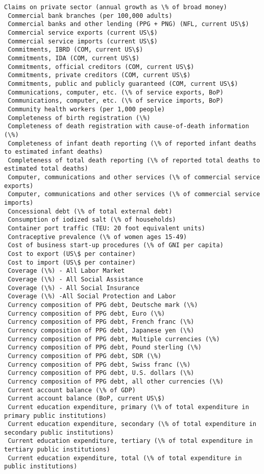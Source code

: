 \documentclass[11pt]{article}
\begin{document}
\begin{Verbatim}[commandchars=\\\{\}]
 Claims on private sector (annual growth as \% of broad money)
 Commercial bank branches (per 100,000 adults)
 Commercial banks and other lending (PPG + PNG) (NFL, current US\$)
 Commercial service exports (current US\$)
 Commercial service imports (current US\$)
 Commitments, IBRD (COM, current US\$)
 Commitments, IDA (COM, current US\$)
 Commitments, official creditors (COM, current US\$)
 Commitments, private creditors (COM, current US\$)
 Commitments, public and publicly guaranteed (COM, current US\$)
 Communications, computer, etc. (\% of service exports, BoP)
 Communications, computer, etc. (\% of service imports, BoP)
 Community health workers (per 1,000 people)
 Completeness of birth registration (\%)
 Completeness of death registration with cause-of-death information (\%)
 Completeness of infant death reporting (\% of reported infant deaths to estimated infant deaths)
 Completeness of total death reporting (\% of reported total deaths to estimated total deaths)
 Computer, communications and other services (\% of commercial service exports)
 Computer, communications and other services (\% of commercial service imports)
 Concessional debt (\% of total external debt)
 Consumption of iodized salt (\% of households)
 Container port traffic (TEU: 20 foot equivalent units)
 Contraceptive prevalence (\% of women ages 15-49)
 Cost of business start-up procedures (\% of GNI per capita)
 Cost to export (US\$ per container)
 Cost to import (US\$ per container)
 Coverage (\%) - All Labor Market
 Coverage (\%) - All Social Assistance
 Coverage (\%) - All Social Insurance
 Coverage (\%) -All Social Protection and Labor
 Currency composition of PPG debt, Deutsche mark (\%)
 Currency composition of PPG debt, Euro (\%)
 Currency composition of PPG debt, French franc (\%)
 Currency composition of PPG debt, Japanese yen (\%)
 Currency composition of PPG debt, Multiple currencies (\%)
 Currency composition of PPG debt, Pound sterling (\%)
 Currency composition of PPG debt, SDR (\%)
 Currency composition of PPG debt, Swiss franc (\%)
 Currency composition of PPG debt, U.S. dollars (\%)
 Currency composition of PPG debt, all other currencies (\%)
 Current account balance (\% of GDP)
 Current account balance (BoP, current US\$)
 Current education expenditure, primary (\% of total expenditure in primary public institutions)
 Current education expenditure, secondary (\% of total expenditure in secondary public institutions)
 Current education expenditure, tertiary (\% of total expenditure in tertiary public institutions)
 Current education expenditure, total (\% of total expenditure in public institutions)

\end{Verbatim}
\end{document}
